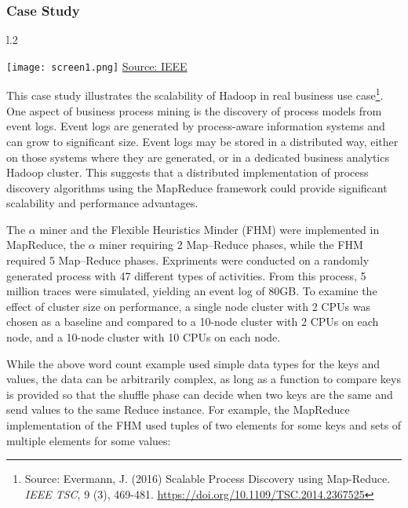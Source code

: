 \newpage
\subsubsection*{Case Study}

\begin{wrapfigure}{l}{.2\textwidth}
\begin{center}
\texttt{[image: screen1.png]}
\scriptsize \url{Source: IEEE}
\end{center}
\end{wrapfigure}
This case study illustrates the scalability of Hadoop in real business use case\footnote{Source: Evermann, J. (2016) Scalable Process Discovery using Map-Reduce. \emph{IEEE TSC}, 9 (3), 469-481. \url{https://doi.org/10.1109/TSC.2014.2367525}}. One aspect of business process mining is the discovery of process models from event logs. Event logs are generated by process-aware information systems and can grow to significant size. Event logs may be stored in a distributed way, either on those systems where they are generated, or in a dedicated business analytics Hadoop cluster. This suggests that a distributed implementation of process discovery algorithms using the MapReduce framework could provide significant scalability and performance advantages. 

The $\alpha$ miner and the Flexible Heuristics Minder (FHM) were implemented in MapReduce, the $\alpha$ miner requiring 2 Map--Reduce phases, while the FHM required 5 Map--Reduce phases. Expriments were conducted on a randomly generated process with 47 different types of activities. From this process, 5 million traces were simulated, yielding an event log of 80GB. To examine the effect of cluster size on performance, a single node cluster with 2 CPUs was chosen as a baseline and compared to a 10-node cluster with 2 CPUs on each node, and a 10-node cluster with 10 CPUs on each node. 

While the above word count example used simple data types for the keys and values, the data can be arbitrarily complex, as long as a function to compare keys is provided so that the shuffle phase can decide when two keys are the same and send values to the same Reduce instance. For example, the MapReduce implementation of the FHM used tuples of two elements for some keys and sets of multiple elements for some values:

